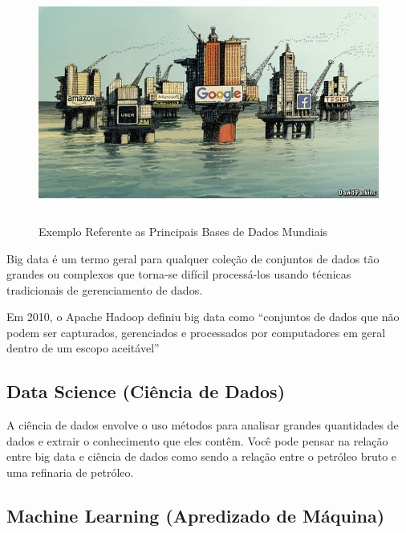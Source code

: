 \vspace{-1.9cm}
\begin{figure}[H]
\centering
\includegraphics[scale=0.5,height=220pt,width=15cm]{figures/dados1.jpeg}
\caption{Exemplo Referente as Principais Bases de Dados Mundiais}
\label{fig:my_label8}
\end{figure}

Big data é um termo geral para qualquer coleção de conjuntos de dados tão grandes ou complexos que torna-se difícil processá-los usando técnicas tradicionais de gerenciamento de dados.\vskip0.3cm

Em 2010, o Apache Hadoop definiu big data como “conjuntos de dados que não podem ser capturados, gerenciados e processados por computadores em geral dentro de um escopo aceitável”





\subsection{Data Science (Ciência de Dados)}

A ciência de dados envolve o uso
métodos para analisar grandes quantidades de dados e extrair o conhecimento que eles contêm.
Você pode pensar na relação entre big data e ciência de dados como sendo
a relação entre o petróleo bruto e uma refinaria de petróleo. 








\subsection{Machine Learning (Apredizado de Máquina)}


